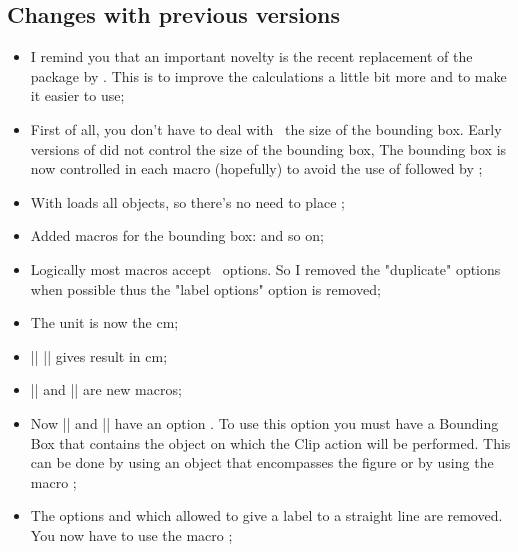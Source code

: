 \subsection{Changes with previous versions} %
\label{sub:changes_with_previous_versions}

\vspace{1cm}
 \begin{itemize}\setlength{\itemsep}{10pt} 

\item I remind you that an important  novelty is the recent replacement of the  package by .  This is to improve the calculations a little bit more and to make it easier to use;


\item First of all, you don’t have to deal with \TIKZ\ the size of the bounding box. Early versions of \tkzname{\tkznameofpack} did not control the size of the bounding box, The bounding box is now controlled in each macro (hopefully) to avoid the use of  followed by ;

\item  With  loads all objects, so there's no need to place ;

\item Added macros for the bounding box:   and so on;

\item  Logically most macros accept \TIKZ\ options. So I removed the "duplicate" options when possible thus the "label options" option is removed;

\item The unit is now the cm;

\item |\tkzCalcLength| |\tkzGetLength| gives result in cm;

\item  |\tkzMarkArc| and |\tkzLabelArc| are new macros;

\item Now |\tkzClipCircle| and |\tkzClipPolygon| have an option . To use this option you must have a Bounding Box that contains the object on which the Clip action will be performed. This can be done by using an object that encompasses the figure or by using the macro ;


\item The options  and  which allowed to give a label to a straight  line are removed. You now have to use the macro ;


\end{itemize}
